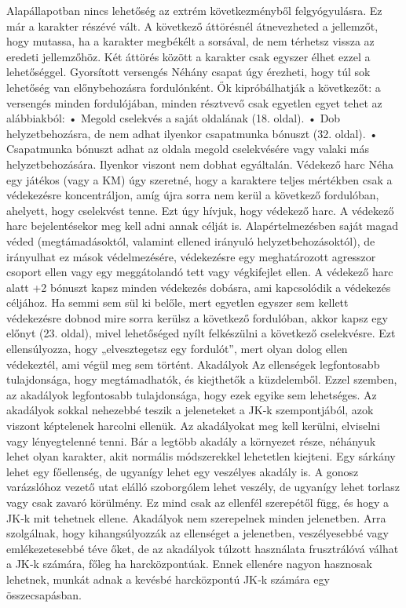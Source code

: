 \documentclass[oneside]{book}
\begin{document}
Alapállapotban nincs lehetőség az extrém következményből felgyógyulásra. Ez már a karakter részévé vált. A következő áttörésnél átnevezheted a jellemzőt, hogy mutassa, ha a karakter megbékélt a sorsával, de nem térhetsz vissza az eredeti jellemzőhöz.
Két áttörés között a karakter csak egyszer élhet ezzel a lehetőséggel.
Gyorsított versengés
Néhány csapat úgy érezheti, hogy túl sok lehetőség van előnybehozásra fordulónként. Ők kipróbálhatják a következőt: a versengés minden fordulójában, minden résztvevő csak egyetlen egyet tehet az alábbiakból:
    • Megold cselekvés a saját oldalának (18. oldal).
    • Dob helyzetbehozásra, de nem adhat ilyenkor csapatmunka bónuszt (32. oldal).
    • Csapatmunka bónuszt adhat az oldala megold cselekvésére vagy valaki más helyzetbehozására. Ilyenkor viszont nem dobhat egyáltalán.
Védekező harc
Néha egy játékos (vagy a KM) úgy szeretné, hogy a karaktere teljes mértékben csak a védekezésre koncentráljon, amíg újra sorra nem kerül a következő fordulóban, ahelyett, hogy cselekvést tenne. Ezt úgy hívjuk, hogy védekező harc.
A védekező harc bejelentésekor meg kell adni annak célját is. Alapértelmezésben saját magad véded (megtámadásoktól, valamint ellened irányuló helyzetbehozásoktól), de irányulhat ez mások védelmezésére, védekezésre egy meghatározott agresszor csoport ellen vagy egy meggátolandó tett vagy végkifejlet ellen.
A védekező harc alatt +2 bónuszt kapsz minden védekezés dobásra, ami kapcsolódik a védekezés céljához.
Ha semmi sem sül ki belőle, mert egyetlen egyszer sem kellett védekezésre dobnod mire sorra kerülsz a következő fordulóban, akkor kapsz egy előnyt (23. oldal), mivel lehetőséged nyílt felkészülni a következő cselekvésre. Ezt ellensúlyozza, hogy „elvesztegetsz egy fordulót”, mert olyan dolog ellen védekeztél, ami végül meg sem történt.
Akadályok
Az ellenségek legfontosabb tulajdonsága, hogy megtámadhatók, és kiejthetők a küzdelemből. Ezzel szemben, az akadályok legfontosabb tulajdonsága, hogy ezek egyike sem lehetséges. Az akadályok sokkal nehezebbé teszik a jeleneteket a JK‑k szempontjából, azok viszont képtelenek harcolni ellenük. Az akadályokat meg kell kerülni, elviselni vagy lényegtelenné tenni.
Bár a legtöbb akadály a környezet része, néhányuk lehet olyan karakter, akit normális módszerekkel lehetetlen kiejteni. Egy sárkány lehet egy főellenség, de ugyanígy lehet egy veszélyes akadály is. A gonosz varázslóhoz vezető utat elálló szoborgólem lehet veszély, de ugyanígy lehet torlasz vagy csak zavaró körülmény. Ez mind csak az ellenfél szerepétől függ, és hogy a JK‑k mit tehetnek ellene.
Akadályok nem szerepelnek minden jelenetben. Arra szolgálnak, hogy kihangsúlyozzák az ellenséget a jelenetben, veszélyesebbé vagy emlékezetesebbé téve őket, de az akadályok túlzott használata frusztrálóvá válhat a JK‑k számára, főleg ha harcközpontúak. Ennek ellenére nagyon hasznosak lehetnek, munkát adnak a kevésbé harcközpontú JK‑k számára egy összecsapásban.
\end{document}
